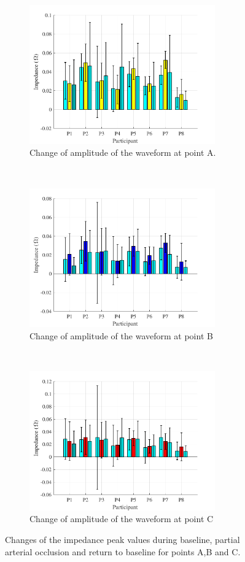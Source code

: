 \begin{figure}[t!]
	\centering
	\begin{subfigure}[t]{0.5\textwidth}
		\centering
		\includegraphics[height=6cm,keepaspectratio]{figure9a}    
		\caption{Change of amplitude of the waveform at point A.}
		\label{fig:change_A_arterial}
	\end{subfigure}%
	~ 
	\begin{subfigure}[t]{0.5\textwidth}
		\centering
		\includegraphics[height=6cm,keepaspectratio,keepaspectratio]{figure9b}    
		\caption{Change of amplitude of the waveform at point B}
		\label{fig:change_B_arterial}
	\end{subfigure}
	~
	\begin{subfigure}[t]{0.5\textwidth}
		\centering
		\includegraphics[height=6cm,keepaspectratio]{figure9c}    
		\caption{Change of amplitude of the waveform at point C}
		\label{fig:change_C_arterial}
	\end{subfigure}%
	\caption{Changes of the impedance peak values during baseline, partial arterial occlusion and return to baseline for points A,B and C.}
	\label{fig:iPG_change_points_arterial}
\end{figure}

